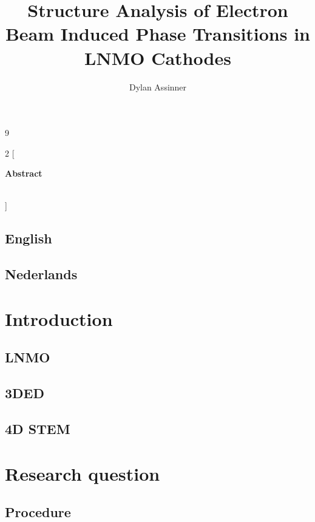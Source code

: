 \documentclass[we,twoside,openright,a4paper,11pt]{uantwerpenbamathesis}
\title{Structure Analysis of Electron Beam Induced Phase Transitions in LNMO Cathodes} %
\author{Dylan Assinner}
\begin{document}
\maketitle

\frontmatter

9

\tableofcontents

\mainmatter

\pagestyle{empty}
\thispagestyle{empty}
\begin{multicols}{2}
	[
	\begin{center}
		\textbf{
			\Large Abstract\\[1ex]
			\@title~\\[0.5ex]}
		\@author
	\end{center}
	]
	
	\section*{English}
	\columnbreak
	\section*{Nederlands}
	
\end{multicols}

\pagestyle{fancy}


\chapter{Introduction}
\section{LNMO}
\section{3DED}
\section{4D STEM}




\chapter{Research question}

\insettext{}

\section{Procedure}
\end{document}

